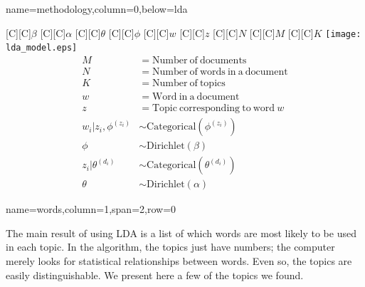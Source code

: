 \documentclass[landscape,final]{baposter}
\begin{document}
\begin{poster}
{  }
  {name=methodology,column=0,below=lda}{

	\begin{centering}
	  [C]{\Large$\beta$}
	  [C]{\Large$\alpha$}
	  [C]{\Large$\theta$}
	  [C]{\Large$\phi$}
	  [C]{\Large$w$}
	  [C]{\Large$z$}
	  [C]{\large$N$}
	  [C]{\large$M$}
	  [C]{\large$K$}
	  \texttt{[image: lda\_model.eps]}
	  \begin{align*} 
		M &= \mathrm{Number\ of\ documents} \\
		N &= \mathrm{Number\ of\ words\ in\ a\ document} \\
		K &= \mathrm{Number\ of\ topics} \\
		w &= \mathrm{Word\ in\ a\ document} \\
		z &= \mathrm{Topic\ corresponding\ to\ word\ } w \\
		w_i|z_i,\phi^{(z_i)} &\sim \mathrm{Categorical}(\phi^{(z_i)}) \\
		\phi &\sim \mathrm{Dirichlet}(\beta) \\
		z_i|\theta^{(d_i)} &\sim \mathrm{Categorical}(\theta^{(d_i)}) \\ 
		\theta &\sim \mathrm{Dirichlet}(\alpha) 
	  \end{align*}
	\end{centering}

  }

  {name=words,column=1,span=2,row=0}{

	The main result of using LDA is a list of which words are most likely to be
	used in each topic.  In the algorithm, the topics just have numbers; the
	computer merely looks for statistical relationships between words.  Even
	so, the topics are easily distinguishable.  We present here a few of the
	topics we found.

}
\end{poster}
\end{document}
